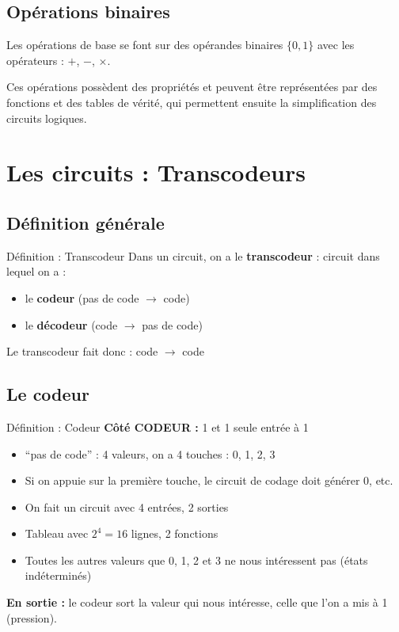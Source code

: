 \documentclass[a4paper,12pt]{article}
\begin{document}
\subsection{Opérations binaires}

Les opérations de base se font sur des opérandes binaires $\{0, 1\}$ avec les opérateurs : $+$, $-$, $\times$.

Ces opérations possèdent des propriétés et peuvent être représentées par des fonctions et des tables de vérité, qui permettent ensuite la simplification des circuits logiques.

\section{Les circuits : Transcodeurs}

\subsection{Définition générale}

\begin{defbox}{Définition : Transcodeur}
Dans un circuit, on a le \textbf{transcodeur} : circuit dans lequel on a :
\begin{itemize}
    \item le \textbf{codeur} (pas de code $\rightarrow$ code)
    \item le \textbf{décodeur} (code $\rightarrow$ pas de code)
\end{itemize}

Le transcodeur fait donc : code $\rightarrow$ code
\end{defbox}

\subsection{Le codeur}

\begin{defbox}{Définition : Codeur}
\textbf{Côté CODEUR :} 1 et 1 seule entrée à 1

\begin{itemize}
    \item ``pas de code'' : 4 valeurs, on a 4 touches : 0, 1, 2, 3
    \item Si on appuie sur la première touche, le circuit de codage doit générer 0, etc.
    \item On fait un circuit avec 4 entrées, 2 sorties
    \item Tableau avec $2^4 = 16$ lignes, 2 fonctions
    \item Toutes les autres valeurs que 0, 1, 2 et 3 ne nous intéressent pas (états indéterminés)
\end{itemize}

\textbf{En sortie :} le codeur sort la valeur qui nous intéresse, celle que l'on a mis à 1 (pression).
\end{defbox}
\end{document}
